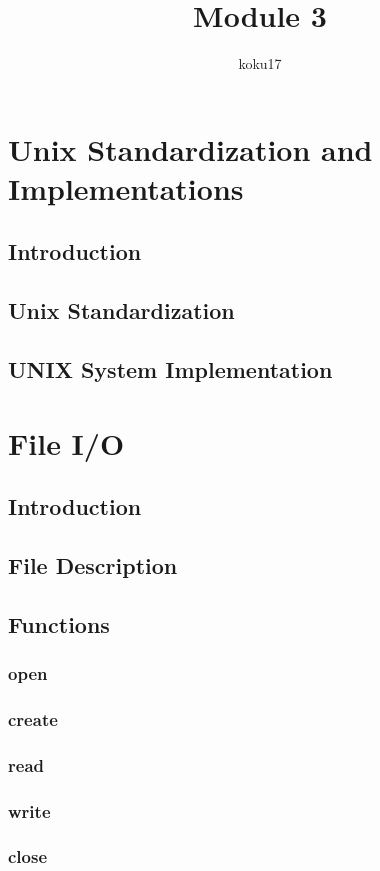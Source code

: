 \documentclass{article}
\author{koku17}
\title{Module 3}
\begin{document}
     \maketitle \newpage
     \tableofcontents \newpage
\section{Unix Standardization and Implementations}
\subsection{Introduction}
\subsection{Unix Standardization}
\subsection{UNIX System Implementation}

\section{File I/O}
\subsection{Introduction}
\subsection{File Description}
\subsection{Functions}
\subsubsection{open}
\subsubsection{create}
\subsubsection{read}
\subsubsection{write}
\subsubsection{close}
\end{document}
